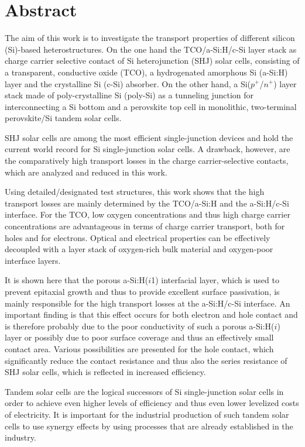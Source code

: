 \chapter*{Abstract}
\label{chap:Abstract}


The aim of this work is to investigate the transport properties of different silicon (Si)-based heterostructures. On the one hand the TCO/a-Si:H/c-Si layer stack as charge carrier selective contact of Si heterojunction (SHJ) solar cells, consisting of a transparent, conductive oxide (TCO), a hydrogenated amorphous Si (a-Si:H) layer and the crystalline Si (c-Si) absorber. On the other hand, a Si($p^+$/$n^+$) layer stack made of poly-crystalline Si (poly-Si) as a tunneling junction for interconnecting a Si bottom and a perovskite top cell in monolithic, two-terminal perovskite/Si tandem solar cells. 

SHJ solar cells are among the most efficient single-junction devices and hold the current world record for Si single-junction solar cells. A drawback, however, are the comparatively high transport losses in the charge carrier-selective contacts, which are analyzed and reduced in this work. 

Using detailed/designated test structures, this work shows that the high transport losses are mainly determined by the TCO/a-Si:H and the a-Si:H/c-Si interface. For the TCO, low oxygen concentrations and thus high charge carrier concentrations are advantageous in terms of charge carrier transport, both for holes and for electrons. Optical and electrical properties can be effectively decoupled with a layer stack of oxygen-rich bulk material and oxygen-poor interface layers. 

It is shown here that the porous a-Si:H($i$1) interfacial layer, which is used to prevent epitaxial growth and thus to provide excellent surface passivation, is mainly responsible for the high transport losses at the a-Si:H/c-Si interface. 
An important finding is that this effect occurs for both electron and hole contact and is therefore probably due to the poor conductivity of such a porous a-Si:H($i$) layer or possibly due to poor surface coverage and thus an effectively small contact area.
Various possibilities are presented for the hole contact, which significantly reduce the contact resistance and thus also the series resistance of SHJ solar cells, which is reflected in increased efficiency. 



Tandem solar cells are the logical successors of Si single-junction solar cells in order to achieve even higher levels of efficiency and thus even lower levelized costs of electricity.
It is important for the industrial production of such tandem solar cells to use synergy effects by using processes that are already established in the industry. 

